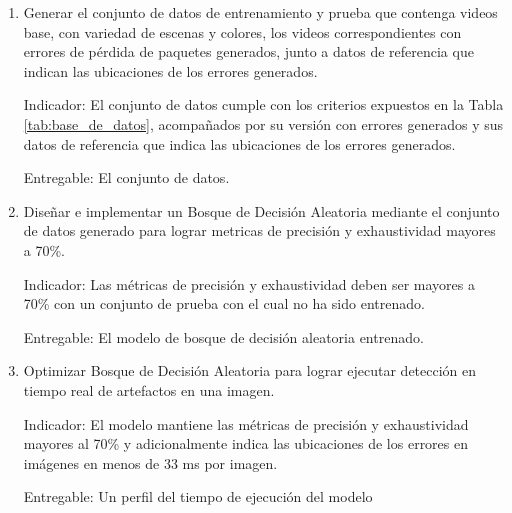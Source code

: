 \begin{enumerate}
    \item Generar el conjunto de datos de entrenamiento y prueba que contenga videos base, con variedad de escenas y colores, los videos correspondientes con errores de pérdida de paquetes generados, junto a datos de referencia que indican las ubicaciones de los errores generados.

    Indicador:  El conjunto de datos cumple con los criterios expuestos en la Tabla \ref{tab:base_de_datos}, acompañados por su versión con errores generados y sus datos de referencia que indica las ubicaciones de los errores generados.

    Entregable: El conjunto de datos.

    \item Diseñar e implementar un Bosque de Decisión Aleatoria mediante el conjunto de datos generado para lograr metricas de precisión y exhaustividad mayores a 70\%.

    Indicador: Las métricas de precisión y exhaustividad deben ser mayores a 70\% con un conjunto de prueba con el cual no ha sido entrenado.

    Entregable: El modelo de bosque de decisión aleatoria entrenado.

    \item Optimizar Bosque de Decisión Aleatoria para lograr ejecutar detección en tiempo real de artefactos en una imagen.

    Indicador: El modelo mantiene las métricas de precisión y exhaustividad mayores al 70\% y adicionalmente indica las ubicaciones de los errores en imágenes en menos de 33 ms por imagen.

    Entregable: Un perfil del tiempo de ejecución del modelo

\end{enumerate}